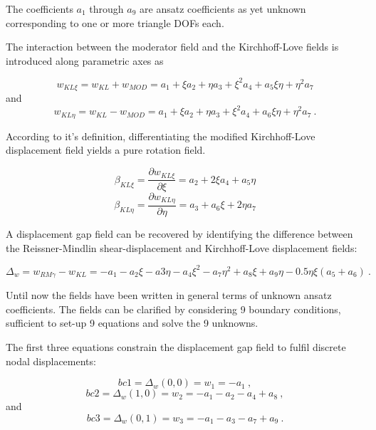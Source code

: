 The coefficients $a_1$ through $a_9$ are ansatz coefficients as yet unknown corresponding to one or more triangle DOFs each.

The interaction between the moderator field and the Kirchhoff-Love fields is introduced along parametric axes as

\begin{equation} 
w_{KL \xi} = w_{KL} + w_{MOD} = a_1 + \xi a_2 + \eta a_3 + \xi^2 a_4 +a_5 \xi \eta + \eta^2 a_7
\label{eqDSGc3_4}
\end{equation}
and
\begin{equation} 
w_{KL \eta} = w_{KL} - w_{MOD} = a_1 + \xi a_2 + \eta a_3 + \xi^2 a_4 +a_6 \xi \eta + \eta^2 a_7
\label{eqDSGc3_5}\ .
\end{equation}

 According to it's definition, differentiating the modified Kirchhoff-Love displacement field yields a pure rotation field.

\begin{equation} 
\beta_{KL \xi} = \frac{\partial w_{KL \xi}}{\partial \xi}  = a_2 + 2 \xi a_4 +a_5 \eta
\label{eqDSGc3_8}
\end{equation}
\begin{equation} 
\beta_{KL \eta} = \frac{\partial w_{KL \eta}}{\partial \eta}  =a_3 +a_6 \xi + 2 \eta a_7
\label{eqDSGc3_9}
\end{equation}

A displacement gap field can be recovered by identifying the difference between the Reissner-Mindlin shear-displacement and Kirchhoff-Love displacement fields:

\begin{equation} 
\Delta_w = w_{RM\gamma} - w_{KL}  =-a_1 - a_2\xi - a3\eta - a_4\xi^2 - a_7\eta^2 + a_8\xi + a_9\eta - 0.5\eta\xi(a_5 + a_6)
\label{eqDSGc3_10}\ .
\end{equation}

Until now the fields have been written in general terms of unknown ansatz coefficients. The fields can be clarified by considering 9 boundary conditions, sufficient to set-up 9 equations and solve the 9 unknowns.

The first three equations constrain the displacement gap field to fulfil discrete nodal displacements:

\begin{equation} 
bc1 = \Delta_w(0,0) = w_1 = -a_1
\label{eqDSGc3_11}\ ,
\end{equation}
\begin{equation} 
bc2 = \Delta_w(1,0) = w_2 = -a_1 -a_2 -a_4 + a_8
\label{eqDSGc3_12}\ ,
\end{equation}
and
\begin{equation} 
bc3 = \Delta_w(0,1) = w_3 = -a_1 -a_3 -a_7 + a_9
\label{eqDSGc3_13}\ .
\end{equation}

